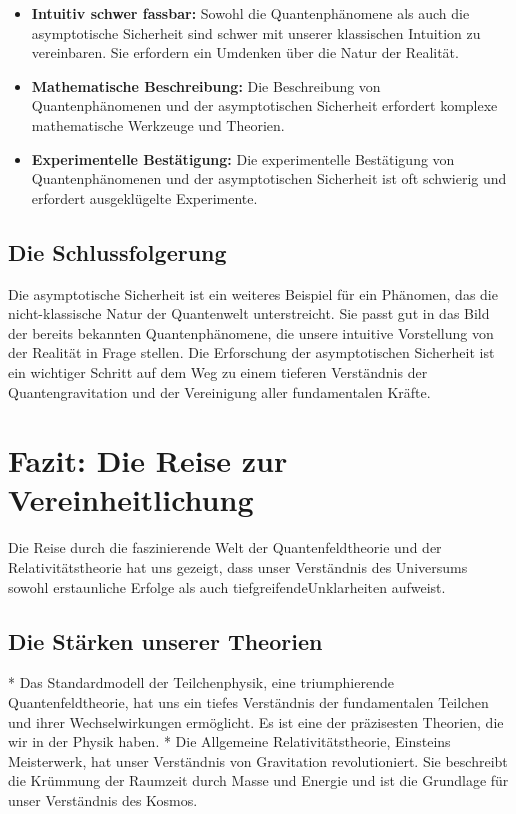 \documentclass{article}
\begin{document}
\begin{itemize}
	\item \textbf{Intuitiv schwer fassbar:} Sowohl die Quantenphänomene als auch die asymptotische Sicherheit sind schwer mit unserer klassischen Intuition zu vereinbaren. Sie erfordern ein Umdenken über die Natur der Realität.
	\item \textbf{Mathematische Beschreibung:} Die Beschreibung von Quantenphänomenen und der asymptotischen Sicherheit erfordert komplexe mathematische Werkzeuge und Theorien.
	\item \textbf{Experimentelle Bestätigung:} Die experimentelle Bestätigung von Quantenphänomenen und der asymptotischen Sicherheit ist oft schwierig und erfordert ausgeklügelte Experimente.
\end{itemize}

\subsection{Die Schlussfolgerung}

Die asymptotische Sicherheit ist ein weiteres Beispiel für ein Phänomen, das die nicht-klassische Natur der Quantenwelt unterstreicht. Sie passt gut in das Bild der bereits bekannten Quantenphänomene, die unsere intuitive Vorstellung von der Realität in Frage stellen. Die Erforschung der asymptotischen Sicherheit ist ein wichtiger Schritt auf dem Weg zu einem tieferen Verständnis der Quantengravitation und der Vereinigung aller fundamentalen Kräfte.

\section{Fazit: Die Reise zur Vereinheitlichung}

Die Reise durch die faszinierende Welt der Quantenfeldtheorie und der Relativitätstheorie hat uns gezeigt, dass unser Verständnis des Universums sowohl erstaunliche Erfolge als auch tiefgreifendeUnklarheiten aufweist.

\subsection{Die Stärken unserer Theorien}

*   Das Standardmodell der Teilchenphysik, eine triumphierende Quantenfeldtheorie, hat uns ein tiefes Verständnis der fundamentalen Teilchen und ihrer Wechselwirkungen ermöglicht. Es ist eine der präzisesten Theorien, die wir in der Physik haben.
*   Die Allgemeine Relativitätstheorie, Einsteins Meisterwerk, hat unser Verständnis von Gravitation revolutioniert. Sie beschreibt die Krümmung der Raumzeit durch Masse und Energie und ist die Grundlage für unser Verständnis des Kosmos.
\end{document}
